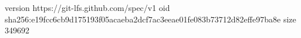 version https://git-lfs.github.com/spec/v1
oid sha256:e19fcc6cb9d175193f05acaeba2dcf7ac3eeae01fe083b73712d82effe97ba8e
size 349692
